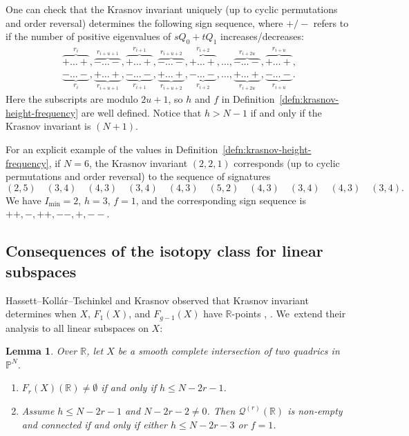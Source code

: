 \documentclass[JEP,XML,SOM,Unicode,NoEqCountersInSection,published]{cedram}
\let\bb\mathbb\let\Bbb\mathbb
\theoremstyle{plain}
\newtheorem{lem}[thm]{Lemma}
\theoremstyle{definition}
\renewcommand\P{\mathbb{P}}
\newcommand\R{\mathbb{R}}
\begin{document}
One can check that the Krasnov invariant uniquely (up to cyclic permutations and order reversal) determines the following sign sequence, where \(+/-\) refers to if the number of positive eigenvalues of \(s Q_0 + t Q_1\) increases/decreases:
\begin{gather*}
\overbrace{+ \dots +}^{r_i}, \overbrace{- \dots -}^{r_{i+u+1}}, \overbrace{+ \dots +}^{r_{i+1}}, \overbrace{- \dots -}^{r_{i+u+2}}, \overbrace{+ \dots +}^{r_{i+2}}, \dots, \overbrace{- \dots -}^{r_{i+2u}}, \overbrace{+ \dots +}^{r_{i+u}}, \\
\underbrace{- \dots -}_{r_i}, \underbrace{+ \dots +}_{r_{i+u+1}}, \underbrace{- \dots -}_{r_{i+1}}, \underbrace{+ \dots +}_{r_{i+u+2}}, \underbrace{- \dots -}_{r_{i+2}}, \dots, \underbrace{+ \dots +}_{r_{i+2u}}, \underbrace{- \dots -}_{r_{i+u}}.
\end{gather*}
Here the subscripts are modulo \(2u+1\), so \(h\) and \(f\) in Definition~\ref{defn:krasnov-height-frequency} are well defined.
Notice that \(h > N-1\) if and only if the Krasnov invariant is \((N+1)\).

For an explicit example of the values in Definition~\ref{defn:krasnov-height-frequency}, if \(N=6\), the Krasnov invariant \((2,2,1)\) corresponds (up to cyclic permutations and order reversal) to the sequence of signatures
\[
(2,5)\quad (3,4) \quad (4,3) \quad (3,4) \quad (4,3) \quad (5,2) \quad (4,3) \quad (3,4) \quad (4,3) \quad (3,4).
\]
We have \(I_{\min}=2\), \(h=3\), \(f=1\), and the corresponding sign sequence is
\(++,-,++,--,+,--\).

\subsection{Consequences of the isotopy class for linear subspaces}\label{sec:isotopy-consequences}

Hassett--Kollár--Tschinkel
and Krasnov
observed that Krasnov invariant determines when \(X\), \(F_1(X)\), and \(F_{g-1}(X)\) have \(\bb R\)-points \cite[Prop.\,5.1]{HassettKoll'arTschinkel}, \cite[Th.\,3.1 \& 3.6]{krasnov-biquadrics}. We~extend their analysis to all linear subspaces on \(X\):

\begin{lem}\label{lem:width-frequency}
Over $\R$, let $X$ be a smooth complete intersection of two quadrics in~$\P^N$.
\begin{enumerate}
\item\label{item:fano-width} $F_r(X)(\R)\neq \emptyset$ if and only if $h\leq N-2r-1$.
\item\label{item:reallocus-width-frequency} Assume $h\leq N-2r-1$ and \(N - 2r - 2 \neq 0\). Then $\mathcal{Q}^{(r)}(\R)$ is non-empty and connected if and only if either $h\leq N-2r-3$ or $f=1$.
\end{enumerate}
\end{lem}
\end{document}
